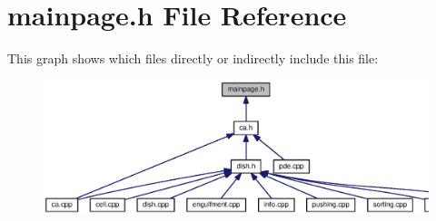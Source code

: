\section{mainpage.\-h File Reference}
\label{mainpage_8h}
This graph shows which files directly or indirectly include this file\-:
\nopagebreak
\begin{figure}[H]
\begin{center}
\leavevmode
\includegraphics[width=350pt]{mainpage_8h__dep__incl}
\end{center}
\end{figure}
